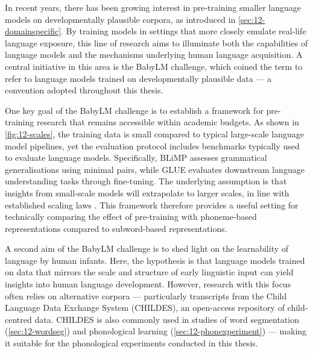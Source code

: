 In recent years, there has been growing interest in pre-training smaller language models on developmentally plausible corpora, as introduced in \cref{sec:12-domainspecific}. By training models in settings that more closely emulate real-life language exposure, this line of research aims to illuminate both the capabilities of language models and the mechanisms underlying human language acquisition. A central initiative in this area is the BabyLM challenge, which coined the term  to refer to language models trained on developmentally plausible data --- a convention adopted throughout this thesis.

One key goal of the BabyLM challenge is to establish a framework for pre-training research that remains accessible within academic budgets. As shown in \cref{fig:12-scales}, the training data is small compared to typical large-scale language model pipelines, yet the evaluation protocol includes benchmarks typically used to evaluate language models. Specifically, BLiMP assesses grammatical generalisations using minimal pairs, while GLUE evaluates downstream language understanding tasks through fine-tuning. The underlying assumption is that insights from small-scale models will extrapolate to larger scales, in line with established scaling laws \citep{kaplan2020scaling}. This framework therefore provides a useful setting for technically comparing the effect of pre-training with phoneme-based representations compared to subword-based representations.

A second aim of the BabyLM challenge is to shed light on the learnability of language by human infants. Here, the hypothesis is that language models trained on data that mirrors the scale and structure of early linguistic input can yield insights into human language development. However, research with this focus often relies on alternative corpora --- particularly transcripts from the Child Language Data Exchange System (CHILDES), an open-access repository of child-centred data. CHILDES is also commonly used in studies of word segmentation (\cref{sec:12-wordseg}) and phonological learning (\cref{sec:12-phonexperiment}) --- making it suitable for the phonological experiments conducted in this thesis.

